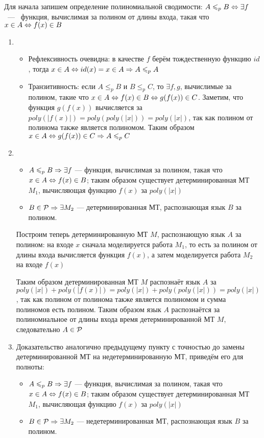 \documentclass[a4paper,12pt]{article}
\begin{document}
\begin{solution}
	Для начала запишем определение полиномиальной сводимости: $A\leq_p B \LRa \exists f$ ~---~ функция, вычислимая за полином от длины входа, такая что $x \in A \LRa f(x) \in B$
	\begin{enumerate}
		\item \begin{itemize}
			\item Рефлексивность очевидна: в качестве $f$ берём тождественную функцию $id$, тогда $x \in A \LRa id(x) = x \in A \Ra A \leq_p A$
			\item Транзитивность: если $A\leq_p B$ и $B\leq_p C$, то $\exists f, g$, вычислимые за полином, такие что $x \in A \LRa f(x) \in B \LRa g(f(x)) \in C$. Заметим, что функция $g(f(x))$ вычисляется за $poly(|f(x)|) = poly(poly(|x|)) = poly(|x|)$, так как полином от полинома также является полиномом. Таким образом $x \in A \LRa g(f(x)) \in C \Ra A \polysv C$
		\end{itemize}
		\item \begin{itemize}
			\item $A \polysv B \Ra \exists f$ --- функция, вычислимая за полином, такая что $x \in A \LRa f(x) \in B$; таким образом существует детерминированная МТ $M_1$, вычисляющая функцию $f(x)$ за $poly(|x|)$
			\item $B \in \P \Ra \exists M_2$ --- детерминированная МТ, распознающая язык $B$ за полином.
		\end{itemize}
		
		Построим теперь детерминированную МТ $M$, распознающую язык $A$ за полином: на входе $x$ сначала моделируется работа $M_1$, то есть за полином от длины входа вычисляется функция $f(x)$, а затем моделируется работа $M_2$ на входе $f(x)$
		
		Таким образом детерминированная МТ $M$ распознаёт язык $A$ за $poly(|x|) + poly(|f(x)|) = poly(|x|) + poly(poly(|x|)) = poly(|x|)$, так как полином от полинома также является полиномом и сумма полиномов есть полином. Таким образом язык $A$ распознаётся за полиномиальное от длины входа время детерминированной МТ $M$, следовательно $A \in \P$
		
		\item Доказательство аналогично предыдущему пункту с точностью до замены детерминированной МТ на недетерминированную МТ, приведём его для полноты:
		
		\begin{itemize}
			\item $A \polysv B \Ra \exists f$ --- функция, вычислимая за полином, такая что $x \in A \LRa f(x) \in B$; таким образом существует детерминированная МТ $M_1$, вычисляющая функцию $f(x)$ за $poly(|x|)$
			\item $B \in \P \Ra \exists M_2$ --- недетерминированная МТ, распознающая язык $B$ за полином.
		\end{itemize}
		

\end{enumerate}
\end{solution}
\end{document}
